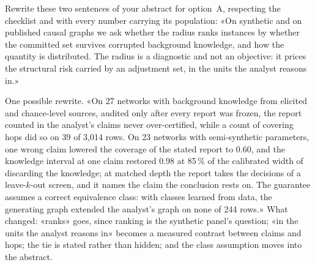 \begin{exercicio}[metodo=rewriting,conceito=deriva-enquadramento]
Rewrite these two sentences of your abstract for option~A, respecting the checklist and with every number
carrying its population: «On synthetic and on published causal graphs we ask whether the radius ranks
instances by whether the committed set survives corrupted background knowledge, and how the quantity is
distributed. The radius is a diagnostic and not an objective: it prices the structural risk carried by an
adjustment set, in the units the analyst reasons in.»
\end{exercicio}
\begin{solucao}
One possible rewrite. «On 27 networks with background knowledge from elicited and chance-level sources,
audited only after every report was frozen, the report counted in the analyst's claims never
over-certified, while a count of covering hops did so on 39 of 3,014 rows. On 23
networks with semi-synthetic parameters, one wrong claim lowered the coverage of the stated report to 0.60,
and the knowledge interval at one claim restored 0.98 at 85\,\% of the calibrated width of discarding the
knowledge; at matched depth the report takes
the decisions of a leave-$k$-out screen, and it names the claim the conclusion rests on. The guarantee
assumes a correct equivalence class: with classes learned from data, the generating graph extended the
analyst's graph on none of 244 rows.» What changed: «ranks» goes, since ranking is the synthetic panel's
question; «in the units the analyst reasons in» becomes a measured contrast between claims and hops; the
tie is stated rather than hidden; and the class assumption moves into the abstract.
\end{solucao}

